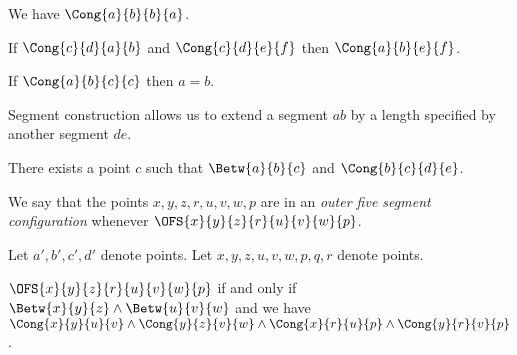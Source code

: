\documentclass[10pt,a4paper,parskip=half,numbers=endperiod,parskip]{scrartcl}
\begin{document}
  \begin{forthel}
    \begin{axiom} %
      We have $\Cong{a}{b}{b}{a}$.
    \end{axiom}
  \end{forthel}


  \begin{forthel}
    \begin{axiom} %
      If $\Cong{c}{d}{a}{b}$ and $\Cong{c}{d}{e}{f}$ then $\Cong{a}{b}{e}{f}$.
    \end{axiom}
  \end{forthel}


  \begin{forthel}
    \begin{axiom} %
      If $\Cong{a}{b}{c}{c}$ then $a = b$.
    \end{axiom}
  \end{forthel}


  Segment construction allows us to extend a segment $ab$
  by a length specified by another segment $de$.

  \begin{forthel}
    \begin{axiom} %
      There exists a point $c$ such that $\Betw{a}{b}{c}$ and $\Cong{b}{c}{d}{e}$.
    \end{axiom}
  \end{forthel}


  We say that the points $x,y,z,r,u,v,w,p$ are in an
  \textit{outer five segment configuration}
  whenever $\OFS{x}{y}{z}{r}{u}{v}{w}{p}$.

  \begin{convention}
    \begin{forthel}
        Let $a', b', c', d'$ denote points.
        Let $x, y, z, u, v, w, p, q, r$ denote points.
      \end{forthel}
  \end{convention}

  \begin{forthel}
    \begin{definition}
      $\OFS{x}{y}{z}{r}{u}{v}{w}{p}$ if and only if
      $\Betw{x}{y}{z}
        \wedge \Betw{u}{v}{w}$
      and we have
      $\Cong{x}{y}{u}{v}
        \wedge \Cong{y}{z}{v}{w}
        \wedge \Cong{x}{r}{u}{p}
        \wedge \Cong{y}{r}{v}{p}$.
    \end{definition}
  \end{forthel}
\end{document}
